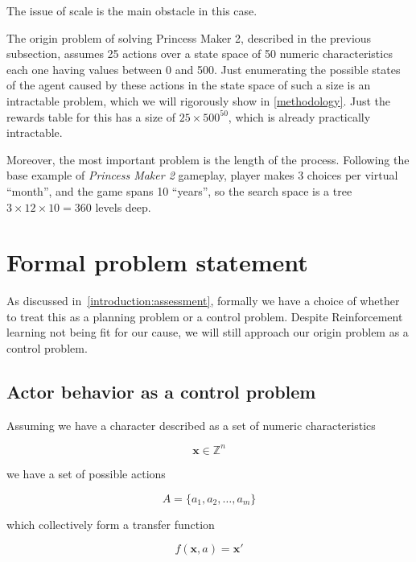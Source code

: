 \documentclass[11pt, a4paper]{article}
\begin{document}
	The issue of scale is the main obstacle in this case.

	The origin problem of solving Princess Maker 2, described in the previous subsection,  assumes 25 actions over a state space of 50 numeric characteristics each one having values between 0 and 500.
	Just enumerating the possible states of the agent caused by these actions in the state space of such a size is an intractable problem, which we will rigorously show in \ref{methodology}.
	Just the rewards table for this has a size of $25 \times 500^{50}$, which is already practically intractable.
	
	Moreover, the most important problem is the length of the process.
	Following the base example of \textit{Princess Maker 2} gameplay, player makes 3 choices per virtual ``month'', and the game spans 10 ``years'', so the search space is a tree $3 \times 12 \times 10 = 360$ levels deep.
	
	\section{Formal problem statement}\label{problem-statement}

	As discussed in~\ref{introduction:assessment}, formally we have a choice of whether to treat this as a planning problem or a control problem.
	Despite Reinforcement learning not being fit for our cause, we will still approach our origin problem as a control problem.

	\subsection{Actor behavior as a control problem}

	Assuming we have a character described as a set of numeric characteristics
	
	\begin{equation}
		\mathbf{x} \in \mathbb{Z}^n
	\end{equation}
	
	we have a set of possible actions
	
	\begin{equation}
		A = \{a_1, a_2,\ldots, a_m\}
	\end{equation}
	
	which collectively form a transfer function
	
	\begin{equation}\label{definitions:transfer-function}
		f(\mathbf{x}, a) = \mathbf{x}'
	\end{equation}
\end{document}
